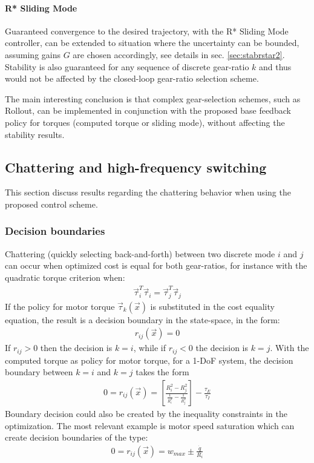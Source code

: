 \paragraph{R* Sliding Mode} Guaranteed convergence to the desired trajectory, with the R* Sliding Mode controller, can be extended to situation where the uncertainty can be bounded, assuming gains $G$ are chosen accordingly, see details in sec. \ref{sec:stabrstar2}. Stability is also guaranteed for any sequence of discrete gear-ratio $k$ and thus would not be affected by the closed-loop gear-ratio selection scheme.

The main interesting conclusion is that complex gear-selection schemes, such as Rollout, can be implemented in conjunction with the proposed base feedback policy for torques (computed torque or sliding mode), without affecting the stability results. 

\subsection{Chattering and high-frequency switching}

This section discuss results regarding the chattering behavior when using the proposed control scheme. 

\subsubsection{Decision boundaries}

Chattering (quickly selecting back-and-forth) between two discrete mode $i$ and $j$ can occur when optimized cost is equal for both gear-ratios, for instance with the quadratic torque criterion when:
%
\begin{align}
\vec{\tau}_i^T \vec{\tau}_i = \vec{\tau}_j^T \vec{\tau}_j
\end{align}
%
If the policy for motor torque $\vec{\tau}_k(\vec{x})$ is substituted in the cost equality equation, the result is a decision boundary in the state-space, in the form:
%
\begin{align}
r_{ij} ( \vec{x} ) = 0
\end{align}
%
If $r_{ij}>0$ then the decision is $k=i$, while if $r_{ij}<0$ the decision is $k=j$. With the computed torque as policy for motor torque, for a 1-DoF system, the decision boundary between $k=i$ and $k=j$ takes the form
%
\begin{align}
0 = r_{ij} ( \vec{x} )  = \left[ \frac{R_i^2-R_j^2}{\frac{1}{R_i^2}-\frac{1}{R_j^2}}\right] - \frac{\tau_E}{\tau_I}
\end{align}
%
Boundary decision could also be created by the inequality constraints in the optimization. The most relevant example is motor speed saturation which can create decision boundaries of the type:
%
\begin{align}
0 = r_{ij} ( \vec{x} )  = w_{max} \pm \frac{\dot{q}}{R_i}
\end{align}
%

